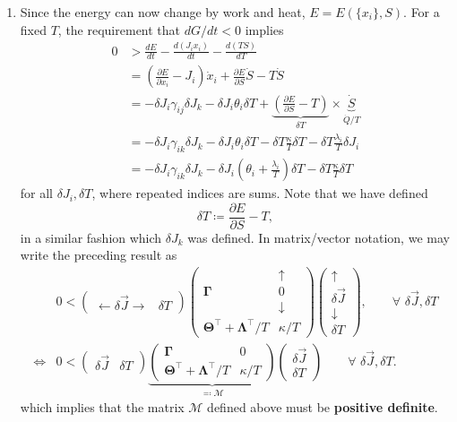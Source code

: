 \documentclass{article}
\theoremstyle{definition}
\newcommand{\p}{\partial}
\newcommand{\f}[2]{\frac{#1}{#2}}
\newcommand{\lp}{\left(}
\newcommand{\rp}{\right)}
\begin{document}
\begin{enumerate}[label=(\alph*)]
	\item Since the energy can now change by work and heat, $E = E(\{x_i\},S)$. For a fixed $T$, the requirement that $dG/dt < 0$ implies
	\begin{align*}
	0 &>  \f{dE}{dt} -\f{d(J_i x_i)}{dt} - \f{d(TS)}{dT} \\
	&= \lp \f{\p E}{\p x_i} - J_i\rp \dot{x}_i + \f{\p E}{\p S}\dot{S} - T\dot{S} \\  
	&= -\delta J_i \gamma_{ij} \delta J_k - \delta J_i \theta_i \delta T + \underbrace{\lp \f{\p E}{\p S} - T \rp}_{\delta T} \times \underbrace{\dot{S}}_{\dot{Q}/T} \\
	&= -\delta J_i\gamma_{ik} \delta J_k - \delta J_i \theta_i \delta T - \delta T \f{\kappa}{T} \delta T - \delta T \f{\lambda_i}{T}  \delta J_i \\
	&= -\delta J_i\gamma_{ik} \delta J_k - \delta J_i \lp \theta_i +\f{\lambda_i}{T} \rp \delta T - \delta T \f{\kappa}{T} \delta T
	\end{align*}
	for all $\delta J_i, \delta T$, where repeated indices are sums. Note that we have defined 
	\begin{equation*}
	\delta T \coloneqq \f{\p E}{\p S} - T,
	\end{equation*}
	in a similar fashion which $\delta J_k$ was defined. In matrix/vector notation, we may write the preceding result as  
	\begin{align*}
	&0 < \begin{pmatrix}
	\leftarrow 
	\delta \vec{J} 
	\rightarrow &
	\delta T
	\end{pmatrix}
	\begin{pmatrix}
	&\uparrow \\
	 \mathbf{\Gamma} & {0}\\
	&\downarrow\\
	\mathbf{\Theta}^\top + \mathbf{\Lambda}^\top/T&  \kappa/T 
	\end{pmatrix}
	\begin{pmatrix}
	\uparrow \\
	\delta \vec{J} \\
	\downarrow \\
	\delta T
	\end{pmatrix}, \quad\quad \forall \,\,\delta \vec{J}, \delta T\\
	\iff 
	&0 < \begin{pmatrix}
	\delta \vec{J} &
	\delta T
	\end{pmatrix}
	\underbrace{\begin{pmatrix}
	\mathbf{\Gamma} & 0\\
	\mathbf{\Theta}^\top + \mathbf{\Lambda}^\top/T & \kappa/T 
	\end{pmatrix}}_{\eqqcolon \mathcal{M}}
	\begin{pmatrix}
	\delta \vec{J} \\
	\delta T
	\end{pmatrix} \quad\quad \forall \,\,\delta \vec{J}, \delta T.
	\end{align*}
	which implies that the matrix $\mathcal{M}$ defined above must be \textbf{positive definite}.
\end{enumerate}
\end{document}
